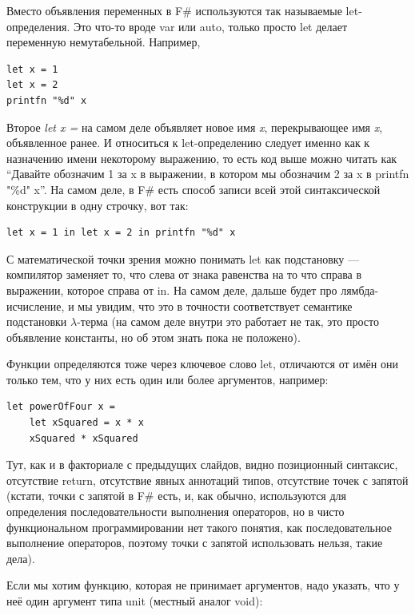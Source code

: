\documentclass[a5paper]{article}
\begin{document}
Вместо объявления переменных в F\# используются так называемые let-определения. Это что-то вроде var или auto, только просто let делает переменную немутабельной. Например,

\begin{verbatim}
let x = 1
let x = 2
printfn "%d" x
\end{verbatim}

Второе \textit{let x =} на самом деле объявляет новое имя \textit{x}, перекрывающее имя \textit{x}, объявленное ранее. И относиться к let-определению следует именно как к назначению имени некоторому выражению, то есть код выше можно читать как ``Давайте обозначим 1 за x в выражении, в котором мы обозначим 2 за x в printfn "\%d" x''. На самом деле, в F\# есть способ записи всей этой синтаксической конструкции в одну строчку, вот так:

\begin{verbatim}
let x = 1 in let x = 2 in printfn "%d" x
\end{verbatim}

С математической точки зрения можно понимать let как подстановку --- компилятор заменяет то, что слева от знака равенства на то что справа в выражении, которое справа от in. На самом деле, дальше будет про лямбда-исчисление, и мы увидим, что это в точности соответствует семантике подстановки $\lambda$-терма (на самом деле внутри это работает не так, это просто объявление константы, но об этом знать пока не положено).

Функции определяются тоже через ключевое слово let, отличаются от имён они только тем, что у них есть один или более аргументов, например:

\begin{verbatim}
let powerOfFour x =
    let xSquared = x * x
    xSquared * xSquared
\end{verbatim}

Тут, как и в факториале с предыдущих слайдов, видно позиционный синтаксис, отсутствие return, отсутствие явных аннотаций типов, отсутствие точек с запятой (кстати, точки с запятой в F\# есть, и, как обычно, используются для определения последовательности выполнения операторов, но в чисто функциональном программировании нет такого понятия, как последовательное выполнение операторов, поэтому точки с запятой использовать нельзя, такие дела).

Если мы хотим функцию, которая не принимает аргументов, надо указать, что у неё один аргумент типа unit (местный аналог void):
\end{document}
